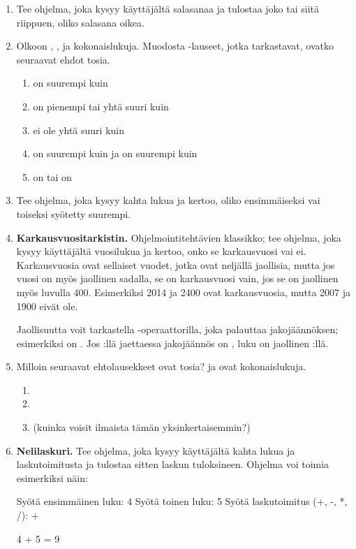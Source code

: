 \begin{enumerate}[\thesection .1]

\item Tee ohjelma, joka kysyy käyttäjältä salasanaa ja tulostaa joko  tai  siitä riippuen, oliko salasana oikea.

\item Olkoon , ,  ja  kokonaislukuja. Muodosta -lauseet, jotka tarkastavat, ovatko seuraavat ehdot tosia.

\begin{enumerate}
\item {} on suurempi kuin 
\item {} on pienempi tai yhtä suuri kuin 
\item {} ei ole yhtä suuri kuin 
\item {} on suurempi kuin  ja  on suurempi kuin 
\item {} on  tai  on 
\end{enumerate}

\item Tee ohjelma, joka kysyy kahta lukua ja kertoo, oliko ensimmäiseksi vai toiseksi syötetty suurempi.

\item \textbf{Karkausvuositarkistin.} Ohjelmointitehtävien klassikko; tee ohjelma, joka kysyy käyttäjältä vuosilukua ja kertoo, onko se karkausvuosi vai ei. Karkausvuosia ovat sellaiset vuodet, jotka ovat neljällä jaollisia, mutta jos vuosi on myös jaollinen sadalla, se on karkausvuosi vain, jos se on jaollinen myös luvulla 400. Esimerkiksi 2014 ja 2400 ovat karkausvuosia, mutta 2007 ja 1900 eivät ole.

Jaollisuutta voit tarkastella \code{\%}-operaattorilla, joka palauttaa jakojäännöksen; esimerkiksi  on . Jos :llä jaettaessa jakojäännös on , luku on jaollinen :llä.

\item Milloin seuraavat ehtolausekkeet ovat tosia?  ja  ovat kokonaislukuja.

\begin{enumerate}
\item {}
\item {}
\item {} (kuinka voisit ilmaista tämän yksinkertaisemmin?)
\end{enumerate}

\item \textbf{Nelilaskuri.} Tee ohjelma, joka kysyy käyttäjältä kahta lukua ja laskutoimitusta ja tulostaa sitten laskun tuloksineen. Ohjelma voi toimia esimerkiksi näin:

\begin{output}
Syötä ensimmäinen luku: 4
Syötä toinen luku: 5
Syötä laskutoimitus (+, -, *, /): +

4 + 5 = 9
\end{output}

\end{enumerate}
